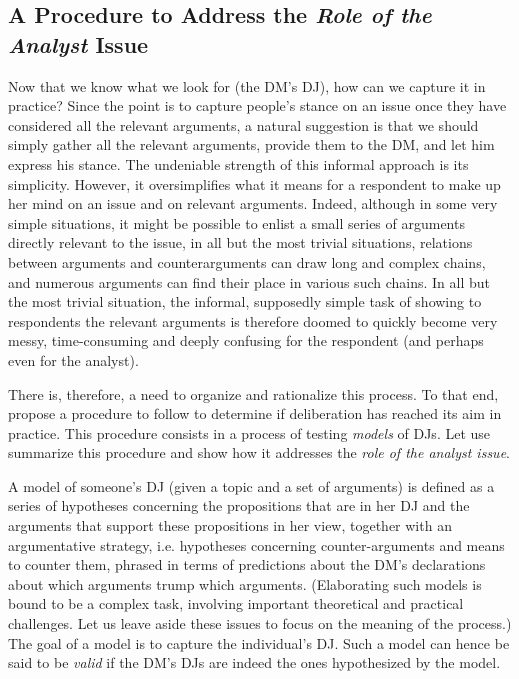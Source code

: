 \documentclass[version=3.21, pagesize, twoside=off, bibliography=totoc, DIV=calc, fontsize=12pt, a4paper, french, english]{scrartcl}
\begin{document}
\subsection{A Procedure to Address the \emph{Role of the Analyst} Issue}
Now that we know what we look for (the \ac{DM}'s \ac{DJ}), how can we capture it in practice? Since the point is to capture people’s stance on an issue once they have considered all the relevant arguments, a natural suggestion is that we should simply gather all the relevant arguments, provide them to the \ac{DM}, and let him express his stance. The undeniable strength of this informal approach is its simplicity. However, it oversimplifies what it means for a respondent to make up her mind on an issue and on relevant arguments. Indeed, although in some very simple situations, it might be possible to enlist a small series of arguments directly relevant to the issue, in all but the most trivial situations, relations between arguments and counterarguments can draw long and complex chains, and numerous arguments can find their place in various such chains. In all but the most trivial situation, the informal, supposedly simple task of showing to respondents the relevant arguments is therefore doomed to quickly become very messy, time-consuming and deeply confusing for the respondent (and perhaps even for the analyst).

There is, therefore, a need to organize and rationalize this process. To that end,  propose a procedure to follow to determine if deliberation has reached its aim in practice. This procedure consists in a process of testing \emph{models} of \acp{DJ}. Let use summarize this procedure and show how it addresses the \emph{role of the analyst issue}.

A model of someone’s \ac{DJ} (given a topic and a set of arguments) is defined as a series of hypotheses concerning the propositions that are in her \ac{DJ} and the arguments that support these propositions in her view, together with an argumentative strategy, i.e. hypotheses concerning counter-arguments and means to counter them, phrased in terms of predictions about the \ac{DM}’s declarations about which arguments trump which arguments. (Elaborating such models is bound to be a complex task, involving important theoretical and practical challenges. Let us leave aside these issues to focus on the meaning of the process.) The goal of a model is to capture the individual’s \ac{DJ}. Such a model can hence be said to be \emph{valid} if the \ac{DM}’s \acp{DJ} are indeed the ones hypothesized by the model.
\end{document}
